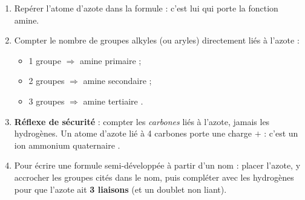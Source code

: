 \documentclass[11pt]{article}
\newcommand{\cle}[1]{{\popxbold\color{popdark}#1}}
\begin{document}
\begin{methode}
\begin{enumerate}
\item Repérer l'atome d'\cle{azote} dans la formule : c'est lui qui porte la fonction amine.
\item \cle{Compter le nombre de groupes alkyles} (ou aryles) directement liés à l'azote :
\begin{itemize}
\item 1 groupe $\Rightarrow$ amine \cle{primaire}  ;
\item 2 groupes $\Rightarrow$ amine \cle{secondaire}  ;
\item 3 groupes $\Rightarrow$ amine \cle{tertiaire} .
\end{itemize}
\item \textbf{Réflexe de sécurité} : compter les \emph{carbones} liés à l'azote, jamais les hydrogènes. Un atome d'azote lié à 4 carbones porte une charge $+$ : c'est un \cle{ion ammonium quaternaire} \ce{[R4N]+}.
\item Pour écrire une formule semi-développée à partir d'un nom : placer l'azote, y accrocher les groupes cités dans le nom, puis compléter avec les hydrogènes pour que l'azote ait \textbf{3 liaisons} (et un doublet non liant).
\end{enumerate}
\end{methode}
\end{document}
